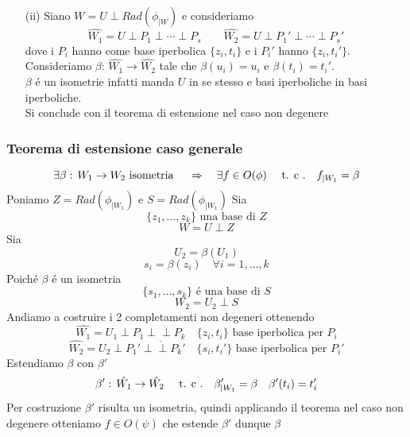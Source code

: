\begin{thm}
\begin{itemize}
Abbiamo dimostrato che $\hat{W}$ sopra costruito \'e un ampliamento, mostriamo che esso \'e un completamento.\\
Sia $\hat{W}'$ un completamento non degenere.\\
Reiterando la costruzione ma estendiamo  
$$ \{ u_1, \dots, u_r,z \} $$
ad una base di $\hat{W}'$.\\
Essendo $\ds \phi_{\vert \hat{W}'} $ non degenere giungiamo alle stesse conclusioni ovvero
$$ W \subseteq \hat{W}\subseteq \hat{W}'$$
Ora poich\'e il completamento non degenere ha dimensione minima $\hat{W}=\hat{W}'$
\item[(ii)]Siano $W= U \perp Rad \left( \phi_{\vert W } \right) $ e consideriamo 
$$ \hat{W_1}= U \perp P_1 \perp \cdots \perp P_s \qquad \hat{W_2}= U \perp P_1' \perp \cdots \perp P_s' $$
dove i $P_i $ hanno come base iperbolica $\{ z_i , t_i \} $ e i $P_i'$ hanno $\{ z_i, t_i' \} $.\\
Consideriamo $\beta:\, \hat{W_1 }\to\hat{ W_2} $ tale che $\beta (u_i)=u_i$ e $\beta(t_i)=t_i' $.\\
$\beta$ \'e un isometrie infatti manda $U$ in se stesso e basi iperboliche in basi iperboliche.\\
Si conclude con il teorema di estensione nel caso non degenere
\end{itemize}
\endproof
\end{thm}
\newpage
\subsubsection{Teorema di estensione caso generale}
\begin{thm}
$$ \exists \beta :\, W_1 \to W_2 \text{ isometria } \quad \Rightarrow \quad \exists f \in O(\phi) \quad \text{ t. c .} \quad f_{\vert W_1}=\beta$$
\proof
Poniamo $Z= Rad \left(\phi_{\vert W_1} \right)$ e $S= Rad \left(\phi_{\vert W_1} \right)$
Sia
$$ \{ z_1, \dots, z_k \} \text{ una base di } Z$$
$$ W= U \perp Z$$
Sia 
$$ U_2 =\beta (U_1)$$
$$ s_i= \beta (z_i) \quad  \forall i=1,\dots, k$$
Poich\'e $\beta$ \'e un isometria 
$$ \{ s_1, \dots, s_k\} \text{ \'e una base di } S $$
$$ W_2= U_2 \perp S $$ 
Andiamo a costruire i 2 completamenti non degeneri ottenendo
$$ \hat{W_1}=U_1 \perp P_1 \perp \dot \perp P_k \quad \{ z_i, t_i \} \text{ base iperbolica per } P_i $$
$$ \hat{W_2}=U_2 \perp P_1'\perp \dot \perp P_k' \quad \{ s_i, t_i' \} \text{ base iperbolica per } P_i' $$
Estendiamo $\beta $ con $\beta'$ 
$$\beta':\, \hat{W_1 } \to \hat{W_2} \quad \text{ t. c .} \quad \beta'_{\vert W_1} = \beta \quad \beta'(t_i)=t_i'$$
Per costruzione $\beta'$ risulta un isometria, quindi applicando il teorema nel caso non degenere otteniamo $f\in O(\psi)$ che estende $\beta'$ dunque $\beta $
\endproof
\end{thm}
\newpage
